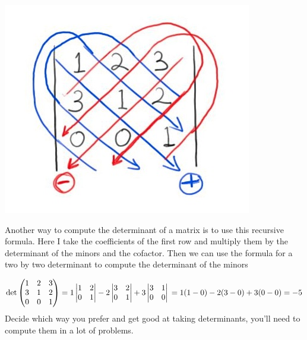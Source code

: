 {\begin{center}
\includegraphics[scale=.35]{determinant_3by3.jpg}
\end{center}


Another way to compute the determinant of a matrix is to use this recursive formula. Here I take the coefficients of the first row and multiply them by the determinant of the minors and the cofactor. Then we can use the formula for a two by two determinant to compute the determinant of the minors%

\[
\text{det}
\begin{pmatrix}
1 & 2 & 3 \\
3 & 1 & 2 \\
0 & 0 & 1 \\
\end{pmatrix}
= 1 
\begin{vmatrix}
1 & 2 \\
0 &1\\
\end{vmatrix} 
-2 
\begin{vmatrix}
3 & 2 \\
0 & 1 \\
\end{vmatrix} 
+ 3 
\begin{vmatrix}
3 & 1 \\
0 & 0 \\
\end{vmatrix}\\
 = 1(1-0) - 2(3-0) + 3(0-0) = -5
\]
Decide which way you prefer and get good at taking determinants, you'll need to compute them in a lot of problems.
}

